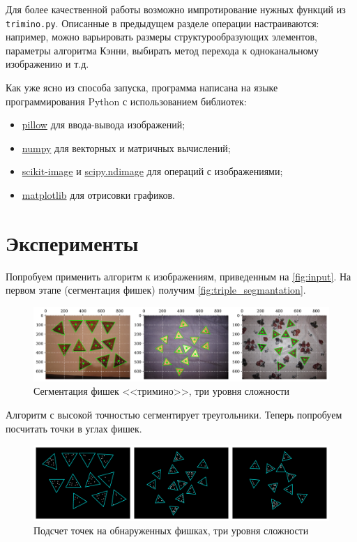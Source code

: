 \documentclass[12pt]{article}
\begin{document}
Для более качественной работы возможно импротирование нужных функций из \verb|trimino.py|. Описанные в предыдущем разделе операции настраиваются: например, можно варьировать размеры структурообразующих элементов, параметры алгоритма Кэнни, выбирать метод перехода к одноканальному изображению и т.д.

Как уже ясно из способа запуска, программа написана на языке программирования Python с использованием библиотек:
\begin{itemize}
    \item \href{https://pypi.org/project/Pillow/}{pillow} для ввода-вывода изображений;
    \item \href{https://pypi.org/project/numpy/}{numpy} для векторных и матричных вычислений;
    \item \href{https://pypi.org/project/scikit-image/}{scikit-image} и \href{https://pypi.org/project/scikit-image/}{scipy.ndimage} для операций с изображениями;
    \item \href{https://pypi.org/project/matplotlib/}{matplotlib} для отрисовки графиков.
\end{itemize}

\section{Эксперименты}

Попробуем применить алгоритм к изображениям, приведенным на \autoref{fig:input}. На первом этапе (сегментация фишек) получим \autoref{fig:triple_segmantation}.

\begin{figure}[!h]
    \includegraphics[width=\linewidth]{triple_segmantation.pdf}
    \centering
    \caption{Сегментация фишек <<тримино>>, три уровня сложности}
    \label{fig:triple_segmantation}
\end{figure}

Алгоритм с высокой точностью сегментирует треугольники. Теперь попробуем посчитать точки в углах фишек.

\begin{figure}[!h]
    \includegraphics[width=\linewidth]{triple_dots.pdf}
    \centering
    \caption{Подсчет точек на обнаруженных фишках, три уровня сложности}
    \label{fig:triple_dots}
\end{figure}
\end{document}
